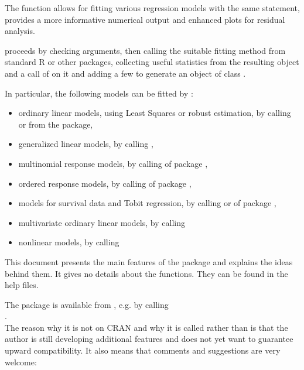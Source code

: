 \documentclass[11pt]{article}\usepackage[]{graphicx}\usepackage[]{color}
\begin{document}
The function  allows for fitting various regression models
with the same statement, provides a more informative numerical output
and enhanced plots for residual analysis. 

 proceeds by 
checking arguments, then calling the suitable fitting method from standard
R or other packages,
collecting useful statistics from the resulting object and a call of 
 on it and adding a few to generate an object of class
. 


In particular, the following models can be fitted by :
\begin{itemize}
\item 
  ordinary linear models, using Least Squares or robust estimation,
  by calling  or  from the  package,
\item
  generalized linear models, by calling ,
\item
  multinomial response models, by calling  of package
  ,
\item
  ordered response models, by calling  of package
  ,
\item
  models for survival data and Tobit regression, by calling
   or  of package ,
\item
  multivariate ordinary linear models, by calling 
\item
  nonlinear models, by calling 
\end{itemize}

This document presents the main features of the package 
and explains the ideas behind them. 
It gives no details about the functions. They can be found in
the help files.

The package is available from , e.g. by calling\\
.\\
The reason why it is not on CRAN and why it is called  rather than 
 is that the author is still developing additional features and
does not yet want to guarantee upward compatibility.
It also means that comments and suggestions are very welcome:
\end{document}

